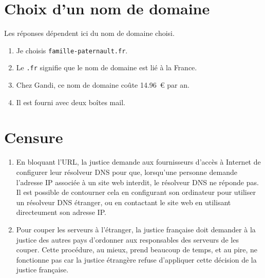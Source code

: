\documentclass[12pt]{article}
\begin{document}
\section{Choix d'un nom de domaine}

Les réponses dépendent ici du nom de domaine choisi.

\begin{enumerate}
  \item Je choisis \texttt{famille-paternault.fr}.
  \item Le \texttt{.fr} signifie que le nom de domaine est lié à la France.
  \item Chez Gandi, ce nom de domaine coûte \SI{14,96}{€} par an.
  \item Il est fourni avec deux boîtes mail.
\end{enumerate}

\section{Censure}

\begin{enumerate}
  \item En bloquant l'URL, la justice demande aux fournisseurs d'accès à Internet de configurer leur résolveur DNS pour que, lorsqu'une personne demande l'adresse IP associée à un site web interdit, le résolveur DNS ne réponde pas. Il est possible de contourner cela en configurant son ordinateur pour utiliser un résolveur DNS étranger, ou en contactant le site web en utilisant directeument son adresse IP.
  \item Pour couper les serveurs à l'étranger, la justice française doit demander à la justice des autres pays d'ordonner aux responsables des serveurs de les couper. Cette procédure, au mieux, prend beaucoup de temps, et au pire, ne fonctionne pas car la justice étrangère refuse d'appliquer cette décision de la justice française.
\end{enumerate}
\end{document}

